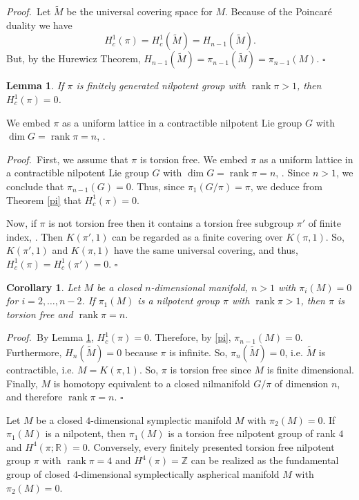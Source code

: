 \documentclass[12pt, twoside]{amsart}
\theoremstyle{plain}
\newtheorem{lemma}[theorem]{Lemma}
\newtheorem{cory}[theorem]{Corollary}
\theoremstyle{definition}
\numberwithin{equation}{section}
\def\RR{\mathbb R}
\def\ZZ{\mathbb Z}
\def\dim{\operatorname {dim}}
\def\rk{\operatorname {rank}}
\def\hqed{\hfill\hfill$\square$}
\def\RR{\mathbb R}
\def\ZZ{\mathbb Z}
\def\m{\medskip}
\def\p{{\it Proof.\ }}
\def\wt #1{\widetilde #1}
\begin{document}
\p Let $\wt M$ be the universal covering space for $M$. Because of the 
Poincar\'e duality we have
$$
H^1_c(\pi)=H^1_c(\wt M)=H_{n-1}(\wt M).
$$
But, by the Hurewicz Theorem, $H_{n-1}(\wt M) = \pi_{n-1}(\wt 
M)=\pi_{n-1}(M)$.
\hqed

\begin{lemma}\label{null}
If $\pi$ is finitely generated nilpotent group with $\rk \pi
>1$, then $H^1_c(\pi)=0$.
\end{lemma}We embed $\pi$ as a 
uniform lattice in a contractible nilpotent Lie group $G$ with $\dim G = \rk 
\pi=n$, \cite{M}.

\p First, we assume that $\pi$ is torsion free. We embed $\pi$ as a 
uniform lattice in a contractible nilpotent Lie group $G$ with $\dim G = \rk 
\pi=n$, \cite{M}. Since $n>1$, we conclude that $\pi_{n-1}(G)=0$. Thus, 
since $\pi_1(G/\pi)=\pi$, we deduce from Theorem \ref{pi} that 
$H^1_c(\pi)=0$.

\m Now, if $\pi$ is not torsion free then it contains a torsion free subgroup 
$\pi'$ of finite index, \cite{Ku}. Then $K(\pi',1)$ can be regarded as a 
finite covering over $K(\pi,1)$. So, $K(\pi',1)$ and  $K(\pi,1)$ have 
the same universal covering, and thus, $H^1_c(\pi)=H^1_c(\pi')=0$. 
\hqed

\begin{cory}\label{rank}
Let $M$ be a closed $n$-dimensional manifold, $n>1$ with $\pi_i(M)=0$ for 
$i=2, 
\ldots, n-2$. If $\pi_1(M)$ is a nilpotent group $\pi$ with $\rk \pi >1$, then 
$\pi$ is torsion free and $\rk \pi =n$. 
\end{cory}

\p By Lemma \ref{null}, $H^1_c(\pi)=0$. Therefore, by \ref{pi}, 
$\pi_{n-1}(M)=0$. Furthermore, $H_n(\wt M)=0$ because $\pi$ is infinite. So, 
$\pi_n(\wt M)=0$, i.e. $\wt M$ is contractible, i.e.  $M=K(\pi,1)$. So, 
$\pi$ is torsion free since $M$ is finite dimensional. Finally, $M$ is 
homotopy equivalent to a closed nilmanifold $G/\pi$ of dimension $n$, and 
therefore $\rk \pi =n$.
\hqed 

\begin{theorem}
\label{4-nil}
Let $M$ be a closed $4$-dimensional symplectic manifold $M$ with $\pi_2(M)=0$. 
If $\pi_1(M)$ is a nilpotent, then $\pi_1(M)$ is a torsion free nilpotent 
group 
of rank $4$ and $H^4(\pi;\RR)=0$. Conversely, every finitely presented torsion 
free nilpotent group $\pi$ with $\rk \pi=4$ and $H^4(\pi)=\ZZ$ can be 
realized as the fundamental group of closed $4$-dimensional symplectically 
aspherical manifold $M$ with $\pi_2(M)=0$.
\end{theorem}
\end{document}

